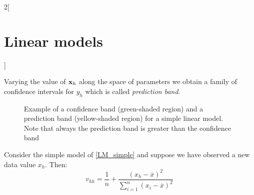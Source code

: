 \documentclass[../../../main_math.tex]{subfiles}
\begin{document}
\begin{multicols}{2}[\section{Linear models}]
\begin{proposition}
\begin{enumerate}
    \end{enumerate}
    Varying the value of $\boldsymbol{\mathrm{x}}_h$ along the space of parameters we obtain a family of confidence intervals for $y_h$ which is called \emph{prediction band}.
  \end{proposition}
  \begin{figure}[H]
    \centering
    
    \caption{Example of a confidence band (green-shaded region) and a prediction band (yellow-shaded region) for a simple linear model. Note that always the prediction band is greater than the confidence band}
  \end{figure}
  \begin{corollary}
    Consider the simple model of \cref{LM_simple} and suppose we have observed a new data value $x_h$. Then: $$v_{hh}=\frac{1}{n}+\frac{{(x_h-\overline{x})}^2}{\sum_{i=1}^n{(x_i-\overline{x})}^2}$$
  \end{corollary}
\end{multicols}
\end{document}
